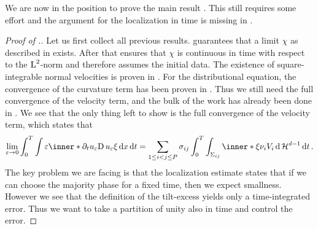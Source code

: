We are now in the position to prove the main result 
. This still requires some effort and the 
argument for the localization in time is missing in 
\cite{convergence_of_allen_cahn_equation_to_multiphase_mean_curvature_flow}.

\begin{proof}[Proof of .]
	Let us first collect all previous results.
	 guarantees that a limit $ \chi 
	$  as described in  exists.
	After that  ensures that 
	$ \chi $ is continuous in time with respect to the $ \operatorname{L}^{ 2 } $-norm and 
	therefore assumes the initial data. The existence of square-integrable 
	normal velocities is proven in 
	.
	For the 
	distributional equation, the convergence of the curvature term has been 
	proven in
	. 
	Thus we still need the full 
	convergence of the velocity term, and the bulk of the work has already been 
	done in .
	We see that the only thing left to show is the full convergence 
	of the velocity term, which states that
	\begin{equation*}
		\lim_{ \varepsilon \to 0 }
		\int_{ 0 }^{ T }
		\int
		\varepsilon
		\inner*{ \partial_{ t } u_{ 
				\varepsilon } }{ \diff u_{ \varepsilon } \xi }
		\dd{ x }
		\dd{ t }
		=
		\sum_{ 1 \leq i < j \leq P }
		\sigma_{ i j }
		\int_{ 0 }^{ T }
		\int_{ \Sigma_{ i j } }
		\inner*{ \xi }{ \nu_{ i } }
		V_{ i }
		\dd{ \hm^{ d - 1 } }
		\dd{ t }.
	\end{equation*} 
	The key problem we are facing is that the localization estimate 
	 states that if we can choose the 
	majority phase for a fixed time, then we expect smallness. However we see 
	that the definition of the tilt-excess yields only a time-integrated error. 
	Thus we want to take a partition of unity also in time and control the 
	error.
	

\end{proof}
